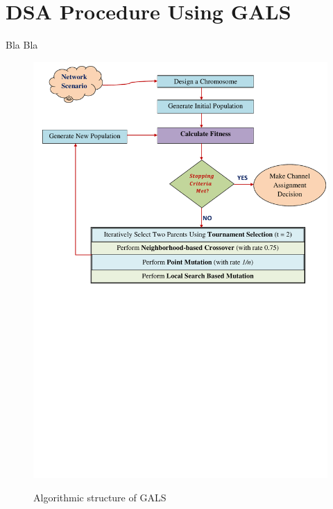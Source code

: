 \chapter{DSA Procedure Using GALS}\label{sec:algo}
Bla Bla

\begin{figure}[!htb]
\begin{center}
\includegraphics [scale=0.8]{algos/GALS.pdf}
\vspace{-106mm}
\caption{Algorithmic structure of GALS}
\vspace{-3mm}
\label{GALSalgo}
\end{center}
\end{figure}


